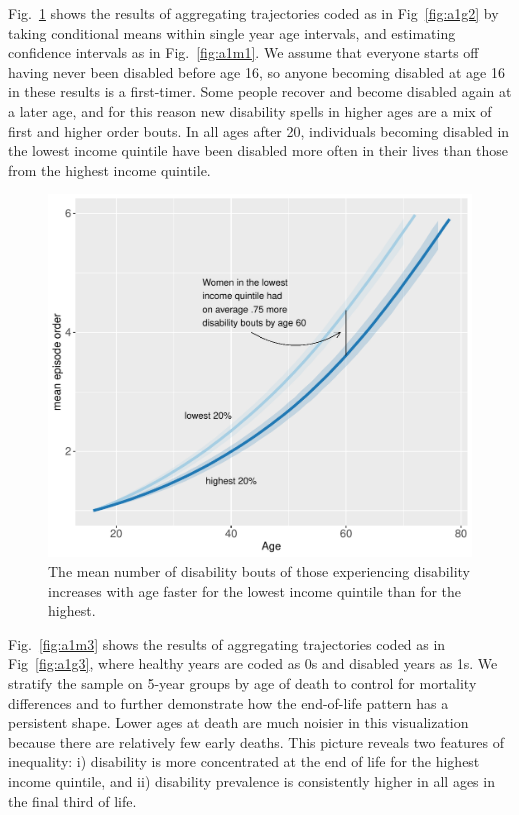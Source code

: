 \documentclass[a4paper,left=1.25cm,right=1.25cm,top=1.25cm,bottom=1.25cm]{article}
\begin{document}
Fig.~\ref{fig:a1m2} shows the results of aggregating trajectories coded as in Fig~\ref{fig:a1g2} by taking conditional means within single year age intervals, and estimating confidence intervals as in Fig.~\ref{fig:a1m1}. We assume that everyone starts off having never been disabled before age 16, so anyone becoming disabled at age 16 in these results is a first-timer. Some people recover and become disabled again at a later age, and for this reason new disability spells in higher ages are a mix of first and higher order bouts. In all ages after 20, individuals becoming disabled in the lowest income quintile have been disabled more often in their lives than those from the highest income quintile.
\begin{figure}
    \centering
    \includegraphics[scale=.6]{Figures/App1_macro2.pdf}
    \caption{The mean number of disability bouts of those experiencing disability increases with age faster for the lowest income quintile than for the highest.}
    \label{fig:a1m2}
\end{figure}

Fig.~\ref{fig:a1m3} shows the results of aggregating trajectories coded as in Fig~\ref{fig:a1g3}, where healthy years are coded as 0s and disabled years as 1s. We stratify the sample on 5-year groups by age of death to control for mortality differences and to further demonstrate how the end-of-life pattern has a persistent shape. Lower ages at death are much noisier in this visualization because there are relatively few early deaths. This picture reveals two features of inequality: i) disability is more concentrated at the end of life for the highest income quintile, and ii) disability prevalence is consistently higher in all ages in the final third of life.
\end{document}
